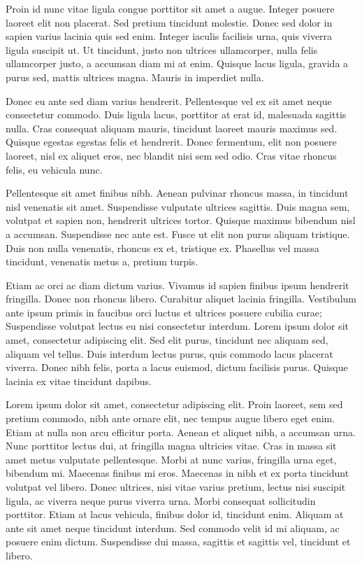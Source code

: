 \documentclass[a4paper, 11pt]{report}
\begin{document}
Proin id nunc vitae ligula congue porttitor sit amet a augue. Integer posuere laoreet elit non placerat. Sed pretium tincidunt molestie. Donec sed dolor in sapien varius lacinia quis sed enim. Integer iaculis facilisis urna, quis viverra ligula suscipit ut. Ut tincidunt, justo non ultrices ullamcorper, nulla felis ullamcorper justo, a accumsan diam mi at enim. Quisque lacus ligula, gravida a purus sed, mattis ultrices magna. Mauris in imperdiet nulla.

Donec eu ante sed diam varius hendrerit. Pellentesque vel ex sit amet neque consectetur commodo. Duis ligula lacus, porttitor at erat id, malesuada sagittis nulla. Cras consequat aliquam mauris, tincidunt laoreet mauris maximus sed. Quisque egestas egestas felis et hendrerit. Donec fermentum, elit non posuere laoreet, nisl ex aliquet eros, nec blandit nisi sem sed odio. Cras vitae rhoncus felis, eu vehicula nunc.

Pellentesque sit amet finibus nibh. Aenean pulvinar rhoncus massa, in tincidunt nisl venenatis sit amet. Suspendisse vulputate ultrices sagittis. Duis magna sem, volutpat et sapien non, hendrerit ultrices tortor. Quisque maximus bibendum nisl a accumsan. Suspendisse nec ante est. Fusce ut elit non purus aliquam tristique. Duis non nulla venenatis, rhoncus ex et, tristique ex. Phasellus vel massa tincidunt, venenatis metus a, pretium turpis.

Etiam ac orci ac diam dictum varius. Vivamus id sapien finibus ipsum hendrerit fringilla. Donec non rhoncus libero. Curabitur aliquet lacinia fringilla. Vestibulum ante ipsum primis in faucibus orci luctus et ultrices posuere cubilia curae; Suspendisse volutpat lectus eu nisi consectetur interdum. Lorem ipsum dolor sit amet, consectetur adipiscing elit. Sed elit purus, tincidunt nec aliquam sed, aliquam vel tellus. Duis interdum lectus purus, quis commodo lacus placerat viverra. Donec nibh felis, porta a lacus euismod, dictum facilisis purus. Quisque lacinia ex vitae tincidunt dapibus.


Lorem ipsum dolor sit amet, consectetur adipiscing elit. Proin laoreet, sem sed pretium commodo, nibh ante ornare elit, nec tempus augue libero eget enim. Etiam at nulla non arcu efficitur porta. Aenean et aliquet nibh, a accumsan urna. Nunc porttitor lectus dui, at fringilla magna ultricies vitae. Cras in massa sit amet metus vulputate pellentesque. Morbi at nunc varius, fringilla urna eget, bibendum mi. Maecenas finibus mi eros. Maecenas in nibh et ex porta tincidunt volutpat vel libero. Donec ultrices, nisi vitae varius pretium, lectus nisi suscipit ligula, ac viverra neque purus viverra urna. Morbi consequat sollicitudin porttitor. Etiam at lacus vehicula, finibus dolor id, tincidunt enim. Aliquam at ante sit amet neque tincidunt interdum. Sed commodo velit id mi aliquam, ac posuere enim dictum. Suspendisse dui massa, sagittis et sagittis vel, tincidunt et libero.
\end{document}
